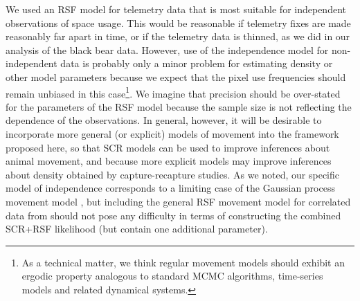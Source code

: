We used an RSF model for telemetry data that is most suitable for
independent observations of space usage.  This would be reasonable if
telemetry fixes are made reasonably far apart in time, or if the
telemetry data %
is thinned, as we did in our analysis of the
black bear data.  However, use of the independence model for
non-independent data is probably only a minor problem for estimating
density or other model parameters because we expect that the pixel use
frequencies should remain unbiased in this case\footnote{As a
  technical matter, we think regular movement models should exhibit an
  ergodic property analogous to standard MCMC algorithms, time-series
  models and related dynamical systems.}.  We imagine that precision
should be over-stated for the parameters of the RSF model because the
sample size is not reflecting the dependence of the observations.  In
general, however, it will be desirable to incorporate more general (or
explicit) models of movement into the framework proposed here, so that
SCR models can be used to improve inferences about animal movement,
and because more explicit models may improve inferences about density
obtained by capture-recapture studies.  As we noted, our specific model
of independence corresponds to a limiting case of the Gaussian process
movement model \citep{johnson_etal:2008}, but including the general
RSF movement model for correlated data from \citet{johnson_etal:2008}
should not pose any difficulty in terms of constructing the combined
SCR+RSF likelihood (but contain one additional parameter).


































